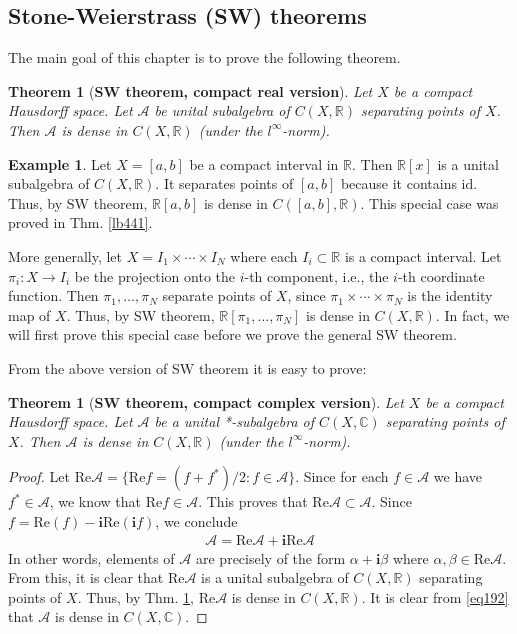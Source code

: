\documentclass[12pt,b5paper,notitlepage]{article}
\theoremstyle{definition}
\newtheorem{eg}[df]{Example}
\theoremstyle{plain}
\newtheorem{thm}[df]{Theorem}
\newcommand{\id}{\mathrm{id}}
\newcommand{\scr}{\mathscr}
\newcommand{\im}{\mathbf{i}}
\newcommand{\Cbb}{\mathbb C}
\newcommand{\Rbb}{\mathbb R}
\newcommand{\Real}{\mathrm{Re}}
\numberwithin{equation}{section}
\begin{document}
\subsection{Stone-Weierstrass (SW) theorems} 




The main goal of this chapter is to prove the following theorem.

\begin{thm}[\textbf{SW theorem, compact real version}]\label{lb442}
Let $X$ be a compact Hausdorff space. Let $\scr A$ be unital subalgebra of $C(X,\Rbb)$ separating points of $X$. Then $\scr A$ is dense in $C(X,\Rbb)$ (under the $l^\infty$-norm).
\end{thm}

\begin{eg}
Let $X=[a,b]$ be a compact interval in $\Rbb$. Then $\Rbb[x]$ is a unital subalgebra of $C(X,\Rbb)$. It separates points of $[a,b]$ because it contains $\id$. Thus, by SW theorem, $\Rbb[a,b]$ is dense in $C([a,b],\Rbb)$. This special case was proved in Thm. \ref{lb441}.

More generally, let $X=I_1\times\cdots\times I_N$ where each $I_i\subset\Rbb$ is a compact interval. Let $\pi_i:X\rightarrow I_i$ be the projection onto the $i$-th component, i.e., the $i$-th coordinate function. Then $\pi_1,\dots,\pi_N$ separate points of $X$, since $\pi_1\times\cdots\times\pi_N$ is the identity map of $X$. Thus, by SW theorem, $\Rbb[\pi_1,\dots,\pi_N]$ is dense in $C(X,\Rbb)$. In fact, we will first prove this special case before we prove the general SW theorem.
\end{eg}

From the above version of SW theorem it is easy to prove:

\begin{thm}[\textbf{SW theorem, compact complex version}]\label{lb450}
Let $X$ be a compact Hausdorff space. Let $\scr A$ be a unital *-subalgebra of $C(X,\Cbb)$ separating points of $X$. Then $\scr A$ is dense in $C(X,\Rbb)$ (under the $l^\infty$-norm).
\end{thm}

\begin{proof}
Let $\Real\scr A=\{\Real f=(f+f^*)/2:f\in\scr A\}$. Since for each $f\in\scr A$ we have $f^*\in\scr A$, we know that $\Real f\in\scr A$. This proves that $\Real\scr A\subset\scr A$. Since $f=\Real( f)-\im\Real(\im f)$, we conclude
\begin{align}
\scr A=\Real\scr A+\im\Real\scr A  \label{eq192}
\end{align}
In other words, elements of $\scr A$ are precisely of the form $\alpha+\im\beta$ where $\alpha,\beta\in\Real\scr A$. From this, it is clear that $\Real\scr A$ is a unital subalgebra of $C(X,\Rbb)$ separating points of $X$. Thus, by Thm. \ref{lb442}, $\Real\scr A$ is dense in $C(X,\Rbb)$. It is clear from \eqref{eq192} that $\scr A$ is dense in $C(X,\Cbb)$.
\end{proof}
\end{document}
